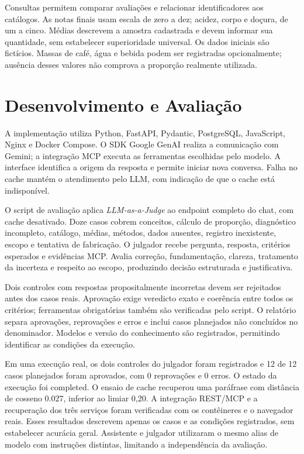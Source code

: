 Consultas permitem comparar avaliações e relacionar identificadores aos catálogos. As notas finais usam escala de zero a dez; acidez, corpo e doçura, de um a cinco. Médias descrevem a amostra cadastrada e devem informar sua quantidade, sem estabelecer superioridade universal. Os dados iniciais são fictícios. Massas de café, água e bebida podem ser registradas opcionalmente; ausência desses valores não comprova a proporção realmente utilizada.

\section{Desenvolvimento e Avaliação}

A implementação utiliza Python, FastAPI, Pydantic, PostgreSQL, JavaScript, Nginx e Docker Compose. O SDK Google GenAI realiza a comunicação com Gemini; a integração MCP executa as ferramentas escolhidas pelo modelo. A interface identifica a origem da resposta e permite iniciar nova conversa. Falha no cache mantém o atendimento pelo LLM, com indicação de que o cache está indisponível.

O script de avaliação aplica \textit{LLM-as-a-Judge} ao endpoint completo do chat, com cache desativado. Doze casos cobrem conceitos, cálculo de proporção, diagnóstico incompleto, catálogo, médias, métodos, dados ausentes, registro inexistente, escopo e tentativa de fabricação. O julgador recebe pergunta, resposta, critérios esperados e evidências MCP. Avalia correção, fundamentação, clareza, tratamento da incerteza e respeito ao escopo, produzindo decisão estruturada e justificativa.

Dois controles com respostas propositalmente incorretas devem ser rejeitados antes dos casos reais. Aprovação exige veredicto exato e coerência entre todos os critérios; ferramentas obrigatórias também são verificadas pelo script. O relatório separa aprovações, reprovações e erros e inclui casos planejados não concluídos no denominador. Modelos e versão do conhecimento são registrados, permitindo identificar as condições da execução.

Em uma execução real, os dois controles do julgador foram registrados e 12 de 12 casos planejados foram aprovados, com 0 reprovações e 0 erros. O estado da execução foi completed. O ensaio de cache recuperou uma paráfrase com distância de cosseno 0.027, inferior ao limiar 0,20. A integração REST/MCP e a recuperação dos três serviços foram verificadas com os contêineres e o navegador reais. Esses resultados descrevem apenas os casos e as condições registrados, sem estabelecer acurácia geral. Assistente e julgador utilizaram o mesmo alias de modelo com instruções distintas, limitando a independência da avaliação.

